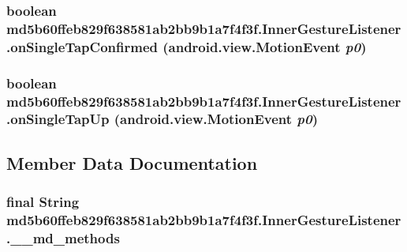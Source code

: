 \hypertarget{classmd5b60ffeb829f638581ab2bb9b1a7f4f3f_1_1_inner_gesture_listener_c3640ab4d9f56cd4ca4bb118d64abaa4}{
\subsubsection[{onSingleTapConfirmed}]{\setlength{\rightskip}{0pt plus 5cm}boolean md5b60ffeb829f638581ab2bb9b1a7f4f3f.InnerGestureListener.onSingleTapConfirmed (android.view.MotionEvent {\em p0})}}
\label{classmd5b60ffeb829f638581ab2bb9b1a7f4f3f_1_1_inner_gesture_listener_c3640ab4d9f56cd4ca4bb118d64abaa4}


\hypertarget{classmd5b60ffeb829f638581ab2bb9b1a7f4f3f_1_1_inner_gesture_listener_de097b243cdda0818112d29738cad2ae}{
\subsubsection[{onSingleTapUp}]{\setlength{\rightskip}{0pt plus 5cm}boolean md5b60ffeb829f638581ab2bb9b1a7f4f3f.InnerGestureListener.onSingleTapUp (android.view.MotionEvent {\em p0})}}
\label{classmd5b60ffeb829f638581ab2bb9b1a7f4f3f_1_1_inner_gesture_listener_de097b243cdda0818112d29738cad2ae}




\subsection{Member Data Documentation}
\hypertarget{classmd5b60ffeb829f638581ab2bb9b1a7f4f3f_1_1_inner_gesture_listener_e6fdb0c574b25527e6407117dcb68256}{
\subsubsection[{\_\-\_\-md\_\-methods}]{\setlength{\rightskip}{0pt plus 5cm}final String {\bf md5b60ffeb829f638581ab2bb9b1a7f4f3f.InnerGestureListener.\_\-\_\-md\_\-methods}}}
\label{classmd5b60ffeb829f638581ab2bb9b1a7f4f3f_1_1_inner_gesture_listener_e6fdb0c574b25527e6407117dcb68256}


